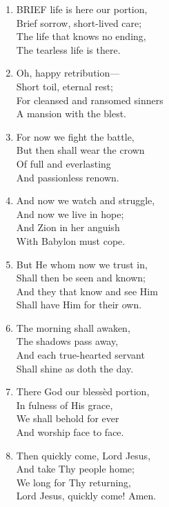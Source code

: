 \begin{enumerate}
    \item BRIEF life is here our portion, \\
        Brief sorrow, short-lived care; \\
        The life that knows no ending, \\
        The tearless life is there.

    \item Oh, happy retribution--- \\
        Short toil, eternal rest; \\
        For cleansed and ransomed sinners \\
        A mansion with the blest.

    \item For now we fight the battle, \\
        But then shall wear the crown \\
        Of full and everlasting \\
        And passionless renown.

    \item And now we watch and struggle, \\
        And now we live in hope; \\
        And Zion in her anguish \\
        With Babylon must cope.

    \item But He whom now we trust in, \\
        Shall then be seen and known; \\
        And they that know and see Him \\
        Shall have Him for their own.

    \item The morning shall awaken, \\
        The shadows pass away, \\
        And each true-hearted servant \\
        Shall shine as doth the day.

    \item There God our bless\`ed portion, \\
        In fulness of His grace, \\
        We shall behold for ever \\
        And worship face to face.

    \item Then quickly come, Lord Jesus, \\
        And take Thy people home; \\
        We long for Thy returning, \\
        Lord Jesus, quickly come! Amen.

\end{enumerate}

